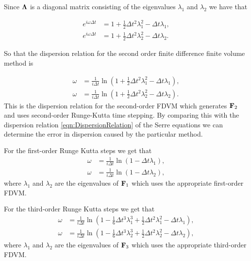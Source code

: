 Since $\mathbf{\Lambda}$ is a diagonal matrix consisting of the eigenvalues $\lambda_1$ and $\lambda_2$ we have that

\begin{align*}
e^{i\omega\Delta t} &= 1 + \frac{1}{2}\Delta t^2 \lambda_{1}^2  -\Delta t\lambda_{1}, \\
e^{i\omega\Delta t} &= 1 + \frac{1}{2}\Delta t^2 \lambda_{2}^2  -\Delta t\lambda_{2}.
\end{align*}

So that the dispersion relation for the second order finite difference finite volume method is

\begin{align}
\label{eqn:DispersionRelationSecondOrder}
\omega &= \frac{1}{i \Delta t} \ln \left(1 + \frac{1}{2}\Delta t^2 \lambda_{1}^2  -\Delta t\lambda_{1}\right), \\
\omega &= \frac{1}{i \Delta t} \ln \left(1 + \frac{1}{2}\Delta t^2 \lambda_{2}^2  -\Delta t\lambda_{2}\right).
\end{align}
This is the dispersion relation for the second-order FDVM which generates $\mathbf{F}_2$ and uses second-order Runge-Kutta time stepping. By comparing this with the dispersion relation \eqref{eqn:DispersionRelation} of the Serre equations we can determine the error in dispersion caused by the particular method.

For the first-order Runge Kutta steps we get that
\begin{align}
\label{eqn:DispersionRelationFirstOrder}
\omega &= \frac{1}{i \Delta t} \ln \left(1 -\Delta t\lambda_{1}\right), \\
\omega &= \frac{1}{i \Delta t} \ln \left(1 -\Delta t\lambda_{2}\right),
\end{align}
where $\lambda_1$ and $\lambda_2$ are the eigenvalues of $\mathbf{F}_1$ which uses the appropriate first-order FDVM.

For the third-order Runge Kutta steps we get that
\begin{align}\label{eqn:DispersionRelationThirdOrder}
\omega &= \frac{1}{i \Delta t} \ln \left(1 - \frac{1}{6}\Delta t^3 \lambda_{1}^3  + \frac{1}{2}\Delta t^2 \lambda_{1}^2  -\Delta t\lambda_{1}\right), \\
\omega &= \frac{1}{i \Delta t} \ln \left(1 - \frac{1}{6}\Delta t^3 \lambda_{2}^3  + \frac{1}{2}\Delta t^2 \lambda_{2}^2  -\Delta t\lambda_{2}\right),
\end{align}
where $\lambda_1$ and $\lambda_2$ are the eigenvalues of $\mathbf{F}_3$ which uses the appropriate third-order FDVM.

